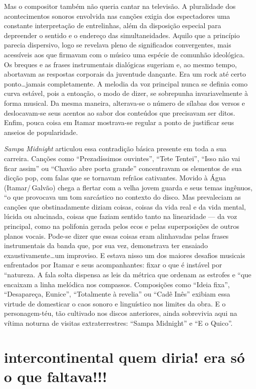 Mas o compositor também não queria cantar na televisão. A pluralidade
dos acontecimentos sonoros envolvida nas canções exigia dos espectadores
uma constante interpretação de entrelinhas, além da disposição especial
para depreender o sentido e o endereço das simultaneidades. Aquilo que a
princípio parecia dispersivo, logo se revelava pleno de significados
convergentes, mais acessíveis aos que firmavam com o músico uma espécie
de comunhão ideológica. Os breques e as frases instrumentais dialógicas
sugeriam e, ao mesmo tempo, abortavam as respostas corporais da
juventude dançante. Era um rock até certo ponto\ldots jamais completamente.
A melodia da voz principal nunca se definia como curva estável, pois a
entoação, o modo de dizer, se sobrepunha invariavelmente à forma
musical. Da mesma maneira, alterava-se o número de sílabas dos versos e
deslocavam-se seus acentos ao sabor dos conteúdos que precisavam ser
ditos. Enfim, pouca coisa em Itamar mostrava-se regular a ponto de
justificar seus anseios de popularidade.

\textit{Sampa Midnight} articulou essa contradição básica presente em toda a sua
carreira. Canções como ``Prezadíssimos ouvintes'', ``Tete Tentei'', ``Isso não vai
ficar assim'' ou ``Chavão abre porta grande'' concentravam os elementos de sua
dicção pop, com falas que se tornavam refrãos cativantes. Movido à Água
(Itamar/\,Galvão) chega a flertar com a velha jovem guarda e seus temas
ingênuos, ``o que provocava um tom sarcástico no contexto do disco. Mas
prevaleciam as canções que obstinadamente diziam coisas, coisas da vida
real e da vida mental, lúcida ou alucinada, coisas que faziam sentido
tanto na linearidade --- da voz principal, como na polifonia gerada pelos
ecos e pelas superposições de outros planos vocais. Pode-se dizer que
essas coisas eram alinhavadas pelas frases instrumentais da banda que,
por sua vez, demonstrava ter ensaiado exaustivamente\ldots um improviso. E
estava nisso um dos maiores desafios musicais enfrentados por Itamar e
seus acompanhantes: fixar o que é instável por ``natureza. A fala solta
dispensa as leis da métrica que ordenam as estrofes e ``que encaixam a
linha melódica nos compassos. Composições como ``Ideia fixa'', ``Desapareça,
Eunice'', ``Totalmente à revelia'' ou ``Cadê Inês'' exibiam essa virtude de
domesticar o caos sonoro e linguístico nos limites da obra. E o
personagem-téu, tão cultivado nos discos anteriores, ainda sobrevivia
aqui na vítima noturna de visitas extraterrestres: ``Sampa Midnight'' e ``E o
Quico''.

\section{intercontinental quem diria! era só o que faltava!!!}

